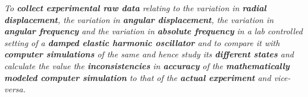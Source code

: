 \textit{To \textbf{collect experimental raw data} relating to the variation in \textbf{radial displacement}, the variation in \textbf{angular displacement}, the variation in \textbf{angular frequency} and the variation in \textbf{absolute frequency} in a lab controlled setting of a \textbf{damped elastic harmonic oscillator} and to compare it with \textbf{computer simulations} of the same and hence study its \textbf{different states} and calculate the value the \textbf{inconsistencies} in \textbf{accuracy} of the \textbf{mathematically modeled computer simulation} to that of the \textbf{actual experiment} and vice-versa.}
